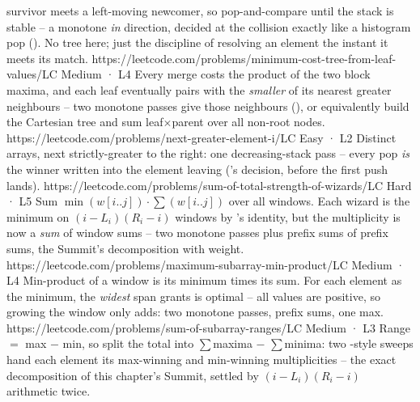\begin{mixedset}
{    survivor meets a left-moving newcomer, so pop-and-compare until the stack is stable -- a monotone
    \emph{in} direction, decided at the collision exactly like a histogram pop ().
    No tree here; just the discipline of resolving an element the instant it meets its match.}
    {https://leetcode.com/problems/minimum-cost-tree-from-leaf-values/}{LC Medium · L4}
    {Every merge costs the product of the two block maxima, and each leaf eventually
    pairs with the \emph{smaller} of its nearest greater neighbours -- two monotone
    passes give those neighbours (), or equivalently build the
    Cartesian tree and sum leaf$\times$parent over all non-root nodes.}
    {https://leetcode.com/problems/next-greater-element-i/}{LC Easy · L2}
    {Distinct arrays, next strictly-greater to the right: one decreasing-stack pass --
    every pop \emph{is} the winner written into the element leaving
    ('s decision, before the first push lands).}
    {https://leetcode.com/problems/sum-of-total-strength-of-wizards/}{LC Hard · L5}
    {Sum $\min(w[i..j]) \cdot \sum(w[i..j])$ over all windows. Each wizard is the
    minimum on $(i-L_i)(R_i-i)$ windows by 's identity, but the
    multiplicity is now a \emph{sum} of window sums -- two monotone passes plus
    prefix sums of prefix sums, the Summit's decomposition with weight.}
    {https://leetcode.com/problems/maximum-subarray-min-product/}{LC Medium · L4}
    {Min-product of a window is its minimum times its sum. For each element as the
    minimum, the \emph{widest} span  grants is optimal -- all values
    are positive, so growing the window only adds: two monotone passes, prefix sums,
    one max.}
    {https://leetcode.com/problems/sum-of-subarray-ranges/}{LC Medium · L3}
    {Range $=$ max $-$ min, so split the total into $\sum$maxima $-$ $\sum$minima: two
    -style sweeps hand each element its max-winning and min-winning
    multiplicities -- the exact decomposition of this chapter's Summit, settled by
    $(i-L_i)(R_i-i)$ arithmetic twice.}
\end{mixedset}


